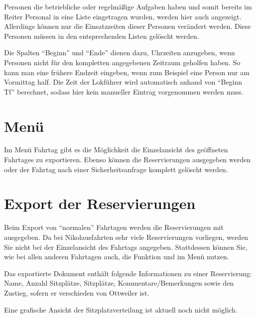 Personen die betriebliche oder regelmäßige Aufgaben haben und somit bereits im Reiter Personal in eine Liste eingetragen wurden, werden hier auch angezeigt.
Allerdings können nur die Einsatzzeiten dieser Personen verändert werden.
Diese Personen müssen in den entsprechenden Listen gelöscht werden.


Die Spalten "`Beginn"' und "`Ende"' dienen dazu, Uhrzeiten anzugeben, wenn Personen nicht für den kompletten angegebenen Zeitraum geholfen haben.
So kann man eine frühere Endzeit eingeben, wenn zum Beispiel eine Person nur am Vormittag half.
Die Zeit der Lokführer wird automatisch anhand von "`Beginn Tf"' berechnet,
sodass hier kein manueller Eintrag vorgenommen werden muss.



\section{Menü}
Im Menü Fahrtag gibt es die Möglichkeit die Einzelansicht des geöffneten Fahrtages zu exportieren.
Ebenso können die Reservierungen ausgegeben werden oder der Fahrtag nach einer Sicherheitsanfrage komplett gelöscht werden.



\section{Export der Reservierungen}
Beim Export von \enquote{normalen} Fahrtagen werden die Reservierungen mit ausgegeben.
Da bei Nikolausfahrten sehr viele Reservierungen vorliegen, werden Sie nicht bei der Einzelansicht des Fahrtags angegeben.
Stattdessen können Sie, wie bei allen anderen Fahrtagen auch,
die Funktion  und  im Menü  nutzen.

Das exportierte Dokument enthält folgende Informationen zu einer Reservierung: Name, Anzahl Sitzplätze, Sitzplätze, Kommentare/Bemerkungen sowie den Zustieg, sofern er verschieden von Ottweiler ist.

Eine grafische Ansicht der Sitzplatzverteilung ist aktuell noch nicht möglich.
